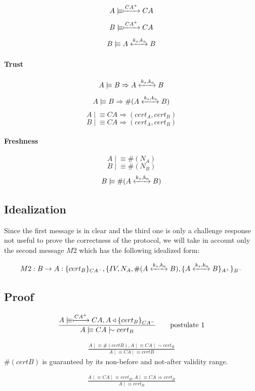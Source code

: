 \documentclass[a4paper,12pt]{article}
\newcommand{\believes}{\mid\!\equiv}
\newcommand{\sees}{\triangleleft}
\newcommand{\oncesaid}{\mid\!\sim}
\newcommand{\controls}{\Rightarrow}
\newcommand{\fresh}[1]{\#(#1)}
\newcommand{\encrypt}[2]{{ \{ #1 \} }_{#2}}
\newcommand{\sharekey}[1]{\xleftrightarrow{#1}}
\newcommand{\pubkey}[1]{\xmapsto{#1}}
\begin{document}
\[A \believes \pubkey{CA^+} CA \]
\[B \believes \pubkey{CA^+} CA \]
\[B \believes A \sharekey{k_s, k_a} B \]

\paragraph{Trust}

\[A \believes B \controls A \sharekey{k_s, k_a} B \]
\[A \believes B \controls \fresh{A \sharekey{k_s, k_a} B} \]
\[A \believes CA \controls (cert_A, cert_B) \]
\[B \believes CA \controls (cert_A, cert_B) \]

\paragraph{Freshness}

\[A \believes \fresh{N_A} \]
\[B \believes \fresh{N_B} \]
\[B \believes \fresh{A \sharekey{k_s, k_a} B} \]

\subsection{Idealization}

Since the first message is in clear and the third one is only a challenge response not useful to prove the correctness of the protocol, we will take in account only the second message $M2$ which has the following idealized form:

\[ M2: B \rightarrow A: \{cert_B\}_{CA^-}, \{IV, N_A, \fresh{A \sharekey{k_s, k_a} B}, \{A \sharekey{k_s, k_a} B\}_{A^+}\}_{B^-} \]

\subsection{Proof}

\begin{align}
\frac{A \believes \pubkey{CA^+} CA, A \sees \encrypt{cert_B}{CA^-}}{A \believes CA \oncesaid cert_B} \tag*{postulate 1}
\end{align}

\begin{align}
\frac{A \believes \fresh{certB}, A \believes CA \oncesaid cert_B}{A \believes CA \believes certB} \tag*{postulate 2}
\end{align}
$\fresh{certB}$ is guaranteed by its non-before and not-after validity range.

\begin{align}
\frac{A \believes CA \believes cert_B, A \believes CA \controls cert_B}{A \believes cert_B} \tag*{postulate 3}
\end{align}
\end{document}
